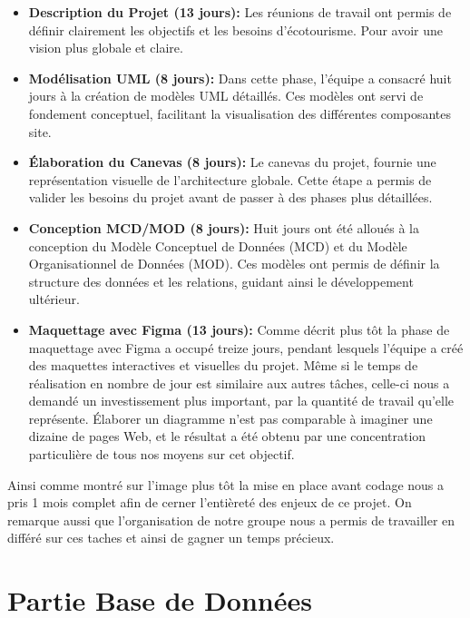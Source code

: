 \documentclass[mstat,12pt]{unswthesis}
\begin{document}
\begin{adjustwidth}{-2cm}{}
\begin{itemize}
\item
  \textbf{Description du Projet (13 jours):} Les réunions de travail ont
  permis de définir clairement les objectifs et les besoins
  d'écotourisme. Pour avoir une vision plus globale et claire.
\item
  \textbf{Modélisation UML (8 jours):} Dans cette phase, l'équipe a
  consacré huit jours à la création de modèles UML détaillés. Ces
  modèles ont servi de fondement conceptuel, facilitant la visualisation
  des différentes composantes site.
\item
  \textbf{Élaboration du Canevas (8 jours):} Le canevas du projet,
  fournie une représentation visuelle de l'architecture globale. Cette
  étape a permis de valider les besoins du projet avant de passer à des
  phases plus détaillées.
\item
  \textbf{Conception MCD/MOD (8 jours):} Huit jours ont été alloués à la
  conception du Modèle Conceptuel de Données (MCD) et du Modèle
  Organisationnel de Données (MOD). Ces modèles ont permis de définir la
  structure des données et les relations, guidant ainsi le développement
  ultérieur.
\item
  \textbf{Maquettage avec Figma (13 jours):} Comme décrit plus tôt la
  phase de maquettage avec Figma a occupé treize jours, pendant lesquels
  l'équipe a créé des maquettes interactives et visuelles du projet.
  Même si le temps de réalisation en nombre de jour est similaire aux
  autres tâches, celle-ci nous a demandé un investissement plus
  important, par la quantité de travail qu'elle représente. Élaborer un
  diagramme n'est pas comparable à imaginer une dizaine de pages Web, et
  le résultat a été obtenu par une concentration particulière de tous
  nos moyens sur cet objectif.
\end{itemize}

Ainsi comme montré sur l'image plus tôt la mise en place avant codage
nous a pris 1 mois complet afin de cerner l'entièreté des enjeux de ce
projet. On remarque aussi que l'organisation de notre groupe nous a
permis de travailler en différé sur ces taches et ainsi de gagner un
temps précieux.

\newpage

\hypertarget{partie-base-de-donnuxe9es}{%
\section{Partie Base de Données}\label{partie-base-de-donnuxe9es}}


\end{adjustwidth}
\end{document}
